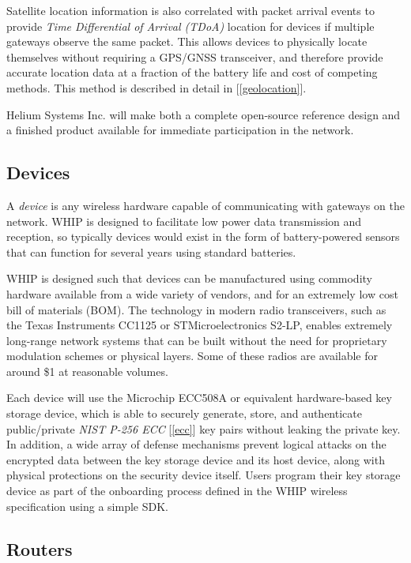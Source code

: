 \documentclass[letterpaper,11pt]{article}
\begin{document}
Satellite location information is also correlated with packet arrival events to provide \emph{Time Differential of Arrival (TDoA)} location for devices if multiple gateways observe the same packet. This allows devices to physically locate themselves without requiring a GPS/GNSS transceiver, and therefore provide accurate location data at a fraction of the battery life and cost of competing methods. This method is described in detail in [\ref{geolocation}].\newline

Helium Systems Inc. will make both a complete open-source reference design and a finished product available for immediate participation in the network.

\subsection{Devices}\label{devices}

A \emph{device} is any wireless hardware capable of communicating with gateways on the network. WHIP is designed to facilitate low power data transmission and reception, so typically devices would exist in the form of battery-powered sensors that can function for several years using standard batteries.\newline

WHIP is designed such that devices can be manufactured using commodity hardware available from a wide variety of vendors, and for an extremely low cost bill of materials (BOM). The technology in modern radio transceivers, such as the Texas Instruments CC1125 or STMicroelectronics S2-LP, enables extremely long-range network systems that can be built without the need for proprietary modulation schemes or physical layers. Some of these radios are available for around \$1 at reasonable volumes.\newline

Each device will use the Microchip ECC508A\cite{ecc} or equivalent hardware-based key storage device, which is able to securely generate, store, and authenticate public/private \emph{NIST P-256 ECC} [\ref{ecc}] key pairs without leaking the private key. In addition, a wide array of defense mechanisms prevent logical attacks on the encrypted data between the key storage device and its host device, along with physical protections on the security device itself. Users program their key storage device as part of the onboarding process defined in the WHIP wireless specification using a simple SDK.

\subsection{Routers}
\end{document}
